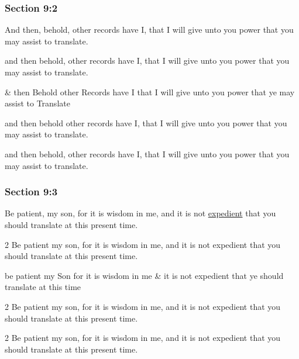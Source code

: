 	\subsubsection{Section 9:2} %
		\label{DC9-2}

		And then, behold, other records have I, that I will give unto you power that you may assist to translate.

		\begin{framed}
		\scriptsize
			\begin{compactdesc}
				\item[JSP] and then behold, other records have I, that I will give unto you power that you may assist to translate.
				\item[RB1] \& then Behold other Records have I that I will give unto you power that ye may assist to Translate
				\item[DC 1835] and then behold other records have I, that I will give unto you power that you may assist to translate.
				\item[DC 1844] and then behold, other records have I, that I will give unto you power that you may assist to translate.
			\end{compactdesc}
		\end{framed}

	\subsubsection{Section 9:3} %
		\label{DC9-3}

		Be patient, my son, for it is wisdom in me, and it is not \hyperref[EXPEDIENT]{expedient} that you should translate at this present time.

		\begin{framed}
		\scriptsize
			\begin{compactdesc}
				\item[JSP] 2 Be patient my son, for it is wisdom in me, and it is not expedient that you should translate at this present time. 
				\item[RB1] be patient my Son for it is wisdom in me \& it is not expedient that ye should translate at this time
				\item[DC 1835] 2 Be patient my son, for it is wisdom in me, and it is not expedient that you should translate at this present time.
				\item[DC 1844] 2 Be patient my son, for it is wisdom in me, and it is not expedient that you should translate at this present time.
			\end{compactdesc}
		\end{framed}

